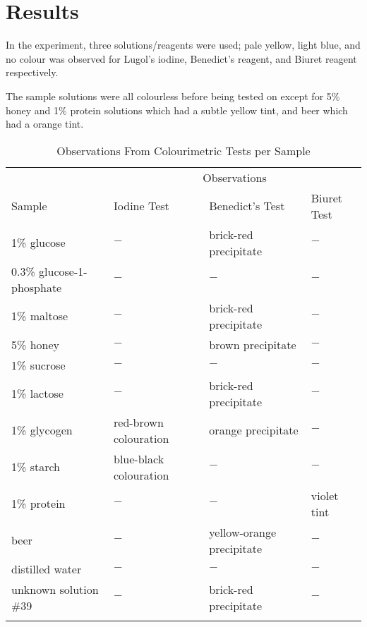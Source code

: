 \section*{Results}

In the experiment, three solutions/reagents were used; pale yellow, light blue, and no colour was observed for Lugol's iodine, Benedict's reagent, and Biuret reagent respectively.

The sample solutions were all colourless before being tested on except for 5\% honey and 1\% protein solutions which had a subtle yellow tint, and beer which had a orange tint.
\newpage

\begin{table}[htbp]
    \begin{threeparttable}
        \caption{Observations From Colourimetric Tests per Sample}
        \begin{minipage}{\linewidth}
            \begin{tabular}{llll}
                \toprule{}
                & \multicolumn{3}{c}{Observations} \\
                \cmidrule{2-4}
                Sample & Iodine Test & Benedict's Test & Biuret Test \\
                \midrule{}
                1\% glucose & \(-\)   & brick-red precipitate & \(-\) \\
                0.3\% glucose-1-phosphate & \(-\)  & \(-\) & \(-\) \\
                1\% maltose & \(-\) & brick-red precipitate & \(-\) \\
                5\% honey & \(-\) & brown precipitate & \(-\) \\
                1\% sucrose & \(-\) & \(-\) & \(-\) \\
                1\% lactose & \(-\) & brick-red precipitate & \(-\) \\
                1\% glycogen & red-brown colouration & orange precipitate & \(-\) \\
                1\% starch & blue-black colouration & \(-\) & \(-\) \\
                1\% protein & \(-\) & \(-\) & violet tint \\
                beer & \(-\) & yellow-orange precipitate & \(-\) \\
                distilled water & \(-\) & \(-\) & \(-\) \\
                unknown solution \#39 & \(-\) & brick-red precipitate & \(-\) \\
                \bottomrule{}
            \end{tabular}\label{tab1}
        \end{minipage}
    \end{threeparttable}
\end{table}
\vspace*{-\baselineskip}

